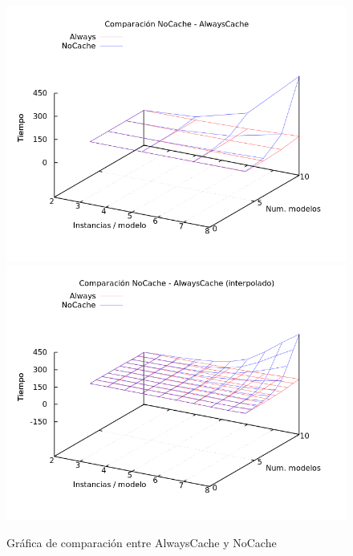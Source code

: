 \begin{figure}[H]
\centering
\includegraphics[scale=0.5]{img/comp-nc-alw}
\includegraphics[scale=0.5]{img/comp-nc-alw-spl}
\caption{Gráfica de comparación entre AlwaysCache y NoCache
\label{fig:grfcompall}}
\end{figure}



